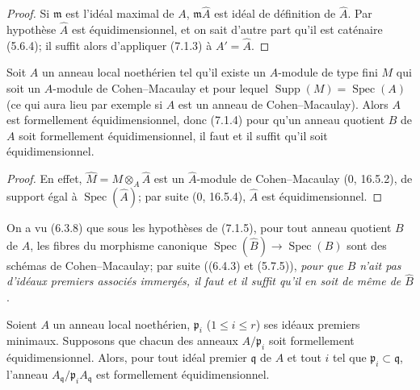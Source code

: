 \begin{proof}
Si $\mathfrak m$ est l'idéal maximal de $A$, $\mathfrak m\widehat A$ est
idéal de définition de $\widehat A$. Par hypothèse $\widehat A$ est
équidimensionnel, et on sait d'autre part qu'il est caténaire (5.6.4); il
suffit alors d'appliquer (7.1.3) à $A'=\widehat A$.
\end{proof}

\begin{corollary}[7.1.5]
\label{IV.2.s7.1.5-fr}
Soit $A$ un anneau local noethérien tel qu'il existe un $A$-module de type
fini $M$ qui soit un $A$-module de Cohen--Macaulay et pour lequel
$\operatorname{Supp}(M)=\operatorname{Spec}(A)$ (ce qui aura lieu par
exemple si $A$ est un anneau de Cohen--Macaulay). Alors $A$ est formellement
équidimensionnel, donc (7.1.4) pour qu'un anneau quotient $B$ de $A$ soit
formellement équidimensionnel, il faut et il suffit qu'il soit
équidimensionnel.
\end{corollary}

\begin{proof}
En effet, $\widehat M=M\otimes_A\widehat A$ est un $\widehat A$-module de
Cohen--Macaulay (0, 16.5.2), de support égal à
$\operatorname{Spec}(\widehat A)$; par suite (0, 16.5.4), $\widehat A$ est
équidimensionnel.
\end{proof}

\begin{remark}[7.1.6]
\label{IV.2.s7.1.6-fr}
On a vu (6.3.8) que sous les hypothèses de (7.1.5), pour tout anneau quotient
$B$ de $A$, les fibres du morphisme canonique
$\operatorname{Spec}(\widehat B)\to\operatorname{Spec}(B)$ sont des schémas
de Cohen--Macaulay; par suite ((6.4.3) et (5.7.5)), \emph{pour que $B$ n'ait
pas d'idéaux premiers associés immergés, il faut et il suffit qu'il en soit
de même de $\widehat B$}.
\end{remark}

\begin{lemma}[7.1.7]
\label{IV.2.s7.1.7-fr}
Soient $A$ un anneau local noethérien, $\mathfrak p_i$
($1\leqslant i\leqslant r$) ses idéaux premiers minimaux. Supposons que
chacun des anneaux $A/\mathfrak p_i$ soit formellement équidimensionnel.
Alors, pour tout idéal premier $\mathfrak q$ de $A$ et tout $i$ tel que
$\mathfrak p_i\subset\mathfrak q$, l'anneau
$A_{\mathfrak q}/\mathfrak p_iA_{\mathfrak q}$ est formellement
équidimensionnel.
\end{lemma}

